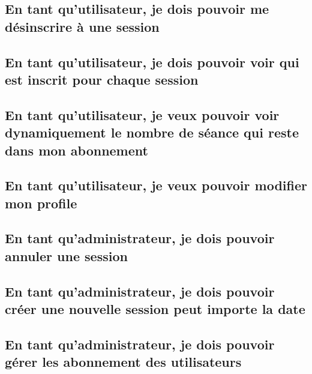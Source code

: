 	\newpage
	\subsection{En tant qu’utilisateur, je dois pouvoir me désinscrire à une session}
		

	\vspace{\baselineskip}
	\subsection{En tant qu’utilisateur, je dois pouvoir voir qui est inscrit pour chaque session}
		
	
	\newpage
	\subsection{En tant qu’utilisateur, je veux pouvoir voir dynamiquement le nombre de séance qui reste dans mon abonnement}
		

	\newpage
	\subsection{En tant qu'utilisateur, je veux pouvoir modifier mon profile}
		

	\newpage
	\subsection{En tant qu’administrateur, je dois pouvoir annuler une session}
		

	\vspace{\baselineskip}
	\subsection{En tant qu'administrateur, je dois pouvoir créer une nouvelle session peut importe la date}
		

	\vspace{\baselineskip}
	\vspace{\baselineskip}
	\subsection{En tant qu'administrateur, je dois pouvoir gérer les abonnement des utilisateurs}
		
